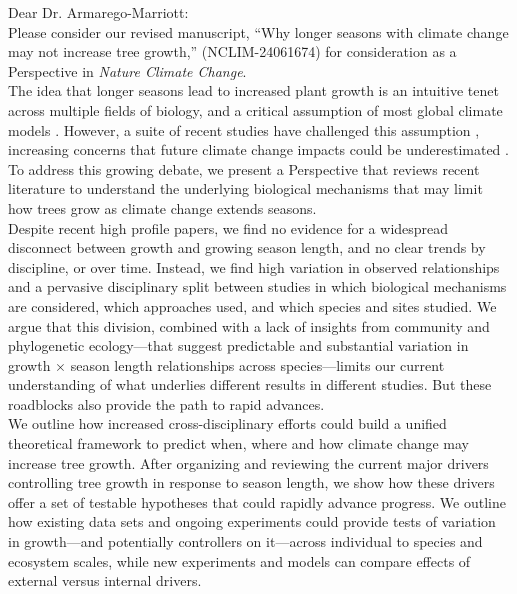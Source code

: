 \documentclass[11pt,a4paper]{article}
\begin{document}
\noindent Dear Dr. Armarego-Marriott:
\vspace{1.5ex}\\
Please consider our revised manuscript, ``Why longer seasons with climate change may not increase tree growth,'' (NCLIM-24061674) for consideration as a Perspective in \emph{Nature Climate Change}. 
\vspace{1.5ex}\\
The idea that longer seasons lead to increased plant growth is an intuitive tenet across multiple fields of biology, and a critical assumption of most global climate models \citep{friedlingstein2022global}. However, a suite of recent studies have challenged this assumption \citep[e.g.][]{dow2022warm,green2022limits}, increasing concerns that future climate change impacts could be underestimated \citep{green2022limits,korner2023four}. To address this growing debate, we present a Perspective that reviews recent literature to understand the underlying biological mechanisms that may limit how trees grow as climate change extends seasons.  
\vspace{1.5ex}\\
Despite recent high profile papers, we find no evidence for a widespread disconnect between growth and growing season length, and no clear trends by discipline, or over time. Instead, we find high variation in observed relationships and a pervasive disciplinary split between studies in which biological mechanisms are considered, which approaches used, and which species and sites studied. We argue that this division, combined with a lack of insights from community and phylogenetic ecology---that suggest predictable and substantial variation in growth $\times$ season length relationships across species---limits our current understanding of what underlies different results in different studies. But these roadblocks also provide the path to rapid advances. 
\vspace{1.5ex}\\
We outline how increased cross-disciplinary efforts could build a unified theoretical framework to predict when, where and how climate change may increase tree growth. After organizing and reviewing the current major drivers controlling tree growth in response to season length, we show how these drivers offer a set of testable hypotheses that could rapidly advance progress. We outline how existing data sets and ongoing experiments could provide tests of variation in growth---and potentially controllers on it---across individual to species and ecosystem scales, while new experiments and models can compare effects of external versus internal drivers. 
\end{document}
